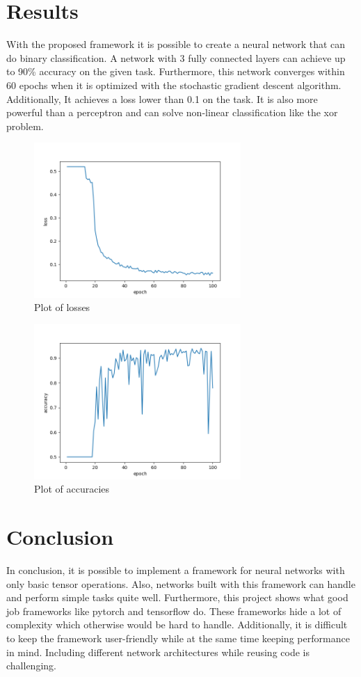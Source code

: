 \documentclass[12pt]{article}
\begin{document}
\section{Results}
With the proposed framework it is possible to create a neural network that can do binary classification.
A network with 3 fully connected layers can achieve up to 90\% accuracy on the given task.
Furthermore, this network converges within 60 epochs when it is optimized with the stochastic gradient descent algorithm. 
Additionally, It achieves a loss lower than 0.1 on the task.
It is also more powerful than a perceptron and can solve non-linear classification like the xor problem.
\begin{figure}[H]
\centering
\includegraphics[width=0.7\textwidth]{"loss.png"}
\caption{Plot of losses}
\end{figure}
\begin{figure}[H]
\centering
\includegraphics[width=0.7\textwidth]{"acc.png"}
\caption{Plot of accuracies}
\end{figure}

\section{Conclusion}
In conclusion, it is possible to implement a framework for neural networks with only basic tensor operations.
Also, networks built with this framework can handle and perform simple tasks quite well.
Furthermore, this project shows what good job frameworks like pytorch and tensorflow do.
These frameworks hide a lot of complexity which otherwise would be hard to handle.
Additionally, it is difficult to keep the framework user-friendly while at the same time keeping performance in mind.
Including different network architectures while reusing code is challenging.
\end{document}
